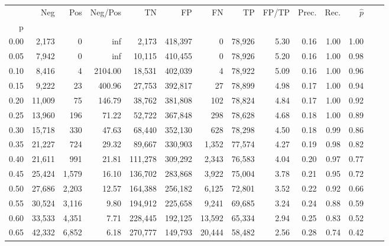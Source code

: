 \begin{tabular}{rrrrrrrrrrrrrr}
\toprule
{} &     Neg &     Pos &  Neg/Pos &       TN &       FP &      FN &      TP & FP/TP & Prec. &  Rec. & $\hat{p}$ \\
p    &         &         &          &          &          &         &         &       &       &       &           \\
\midrule
0.00 &   2,173 &       0 &      inf &    2,173 &  418,397 &       0 &  78,926 &  5.30 &  0.16 &  1.00 &      1.00 \\
0.05 &   7,942 &       0 &      inf &   10,115 &  410,455 &       0 &  78,926 &  5.20 &  0.16 &  1.00 &      0.98 \\
0.10 &   8,416 &       4 &  2104.00 &   18,531 &  402,039 &       4 &  78,922 &  5.09 &  0.16 &  1.00 &      0.96 \\
0.15 &   9,222 &      23 &   400.96 &   27,753 &  392,817 &      27 &  78,899 &  4.98 &  0.17 &  1.00 &      0.94 \\
0.20 &  11,009 &      75 &   146.79 &   38,762 &  381,808 &     102 &  78,824 &  4.84 &  0.17 &  1.00 &      0.92 \\
0.25 &  13,960 &     196 &    71.22 &   52,722 &  367,848 &     298 &  78,628 &  4.68 &  0.18 &  1.00 &      0.89 \\
0.30 &  15,718 &     330 &    47.63 &   68,440 &  352,130 &     628 &  78,298 &  4.50 &  0.18 &  0.99 &      0.86 \\
0.35 &  21,227 &     724 &    29.32 &   89,667 &  330,903 &   1,352 &  77,574 &  4.27 &  0.19 &  0.98 &      0.82 \\
0.40 &  21,611 &     991 &    21.81 &  111,278 &  309,292 &   2,343 &  76,583 &  4.04 &  0.20 &  0.97 &      0.77 \\
0.45 &  25,424 &   1,579 &    16.10 &  136,702 &  283,868 &   3,922 &  75,004 &  3.78 &  0.21 &  0.95 &      0.72 \\
0.50 &  27,686 &   2,203 &    12.57 &  164,388 &  256,182 &   6,125 &  72,801 &  3.52 &  0.22 &  0.92 &      0.66 \\
0.55 &  30,524 &   3,116 &     9.80 &  194,912 &  225,658 &   9,241 &  69,685 &  3.24 &  0.24 &  0.88 &      0.59 \\
0.60 &  33,533 &   4,351 &     7.71 &  228,445 &  192,125 &  13,592 &  65,334 &  2.94 &  0.25 &  0.83 &      0.52 \\
0.65 &  42,332 &   6,852 &     6.18 &  270,777 &  149,793 &  20,444 &  58,482 &  2.56 &  0.28 &  0.74 &      0.42 \\

\end{tabular}
